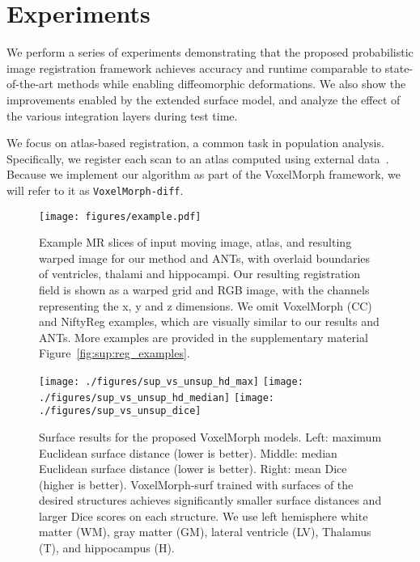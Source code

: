 \documentclass{article}
\newcommand{\citep}{\cite}
\begin{document}
\section{Experiments}
\label{sec:results}






We perform a series of experiments demonstrating that the proposed probabilistic image registration framework achieves accuracy and runtime comparable to state-of-the-art methods while enabling diffeomorphic deformations. We also show the improvements enabled by the extended surface model, and analyze the effect of the various integration layers during test time. 

We focus on atlas-based registration, a common task in population analysis. Specifically, we register each scan to an atlas computed using external data~\citep{fischl2012,sridharan2013}. Because we implement our algorithm as part of the VoxelMorph framework, we will refer to it as \verb|VoxelMorph-diff|.


\begin{figure}[t!]
	\begin{center}
		\texttt{[image: figures/example.pdf]}
	\end{center}
\caption{Example MR slices of input moving image, atlas, and resulting warped image for our method and ANTs, with overlaid boundaries of ventricles, thalami and hippocampi. Our resulting registration field is shown as a warped grid and RGB image, {\color{blue}with the channels representing the x, y and z dimensions}. We omit VoxelMorph (CC) and NiftyReg examples, which are visually similar to our results and ANTs. More examples are provided in the supplementary material Figure~\ref{fig:sup:reg_examples}.
	}
\label{fig:reg_examples}
\end{figure}



\begin{figure*}[t!]
	\centering
\texttt{[image: ./figures/sup\_vs\_unsup\_hd\_max]}
\texttt{[image: ./figures/sup\_vs\_unsup\_hd\_median]}
\texttt{[image: ./figures/sup\_vs\_unsup\_dice]}
\caption{Surface results for the proposed VoxelMorph models. Left: maximum Euclidean surface distance (lower is better). Middle: median Euclidean surface distance (lower is better). Right: mean Dice (higher is better). VoxelMorph-surf trained with surfaces of the desired structures achieves significantly smaller surface distances and larger Dice scores on each structure.   We use left hemisphere white matter (WM), gray matter (GM), lateral ventricle (LV), Thalamus (T), and hippocampus (H).}
	\label{fig:surf-boxplot}
\end{figure*}
\end{document}
